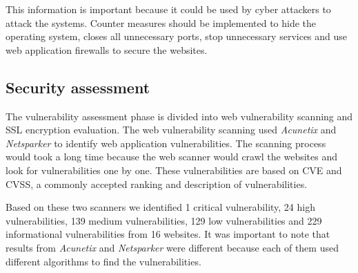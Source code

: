 \documentclass[conference]{IEEEtran}
\begin{document}
This information is important because it could be used by cyber attackers to attack the systems. Counter measures should be implemented to hide the operating system, closes all unnecessary ports, stop unnecessary services and use web application firewalls to secure the websites. 


\subsection{Security assessment}


The vulnerability assessment phase is divided
into web vulnerability
scanning and SSL encryption evaluation. The web vulnerability scanning used
\emph{Acunetix} and \emph{Netsparker} to identify web application vulnerabilities. The scanning process would took a long time because the web scanner would crawl the websites and look for vulnerabilities one by one. These vulnerabilities are
based on CVE and CVSS\cite{makino2015evaluation,basto2017comparison}, a commonly accepted ranking and description of vulnerabilities.

Based on these two scanners we 
identified 1 critical vulnerability, 24 high vulnerabilities, 139 medium
vulnerabilities, 129 low vulnerabilities and 229 informational
vulnerabilities from 16 websites. It was important to note that results from \emph{Acunetix} and \emph{Netsparker} were different because each of them used different algorithms to find the vulnerabilities.
\end{document}
